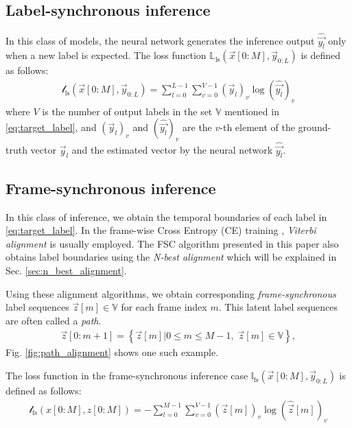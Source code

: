 \documentclass{article}
\begin{document}
\subsection{Label-synchronous inference}
In this class of models, the neural network generates the inference output 
$\widehat{\vec{y_l}}$ 
only when a new label is expected. The loss function 
$\mathbb{L}_{\text{ls}}\left(\vec{x}[0:M], \vec{y}_{0:L}\right)$ is 
defined as follows:
   \begin{align}
     \mathcal{l}_{\text{ls}}\left(\vec{x}[0:M], 
        \vec{y}_{0:L}\right) 
        = \sum_{l=0}^{L-1} 
          \sum_{v=0}^{V-1}
          \left(\vec{y}_l\right)_v  \log ( 
             \widehat{\vec{y_l}} )_{v}
          \label{eq:label_synchronous_ce_loss} 
   \end{align}
where $V$ is the number of output labels in the set $\mathbb{V}$ 
mentioned in \eqref{eq:target_label}, and ${(\vec{y}_l)}_v$  
and ${(\widehat{\vec{y_l}})}_{v}$ are the $v$-th element of the 
ground-truth vector $\vec{y}_l$ and the estimated vector by the 
neural network ${\widehat{\vec{y_l}}}$.


\subsection{Frame-synchronous inference}
\label{sec:frame_synchronous_inference}
In this class of inference,  we obtain
the temporal boundaries of each label in \eqref{eq:target_label}.
In the frame-wise Cross Entropy (CE) training 
\cite{g_hinton_ieee_signal_processing_mag_2012_00, 
C_Kim_INTERSPEECH_2017_1, 
B_Li_INTERSPEECH_2017_1}, {\it Viterbi alignment}  
\cite{
x_huang_prentice_hall_2001_00,
l_r_rabiner_proceedings_of_ieee_1989_00} is usually employed. 
The FSC algorithm presented in this paper also obtains
label boundaries using the {\it N-best alignment} which will
be explained in Sec. \ref{sec:n_best_alignment}.

Using these alignment algorithms, 
we obtain corresponding {\it frame-synchronous} label sequences 
$\vec{z}[m] \in \mathbb{V}$ for each frame index $m$. This
latent label sequences are often called a {\it path}.
  \begin{align}
    \vec{z}[0:m+1]  =  
      \left\{\vec{z}[m]  \Big| 0 \le m \le M-1, \; \vec{z}[m] \in \mathbb{V} \right\}, 
    \label{eq:latent_label_seq}
  \end{align}
Fig. \ref{fig:path_alignment} shows one such example. 

The loss function in the frame-synchronous inference case
$\mathbb{l}_{\text{fs}}\left(\vec{x}[0:M], \vec{y}_{0:L}\right)$ is 
defined as follows:
\begin{align}
  \mathcal{l}_{\text{fs}}\left(x[0:M], z[0:M]\right) 
      = - \sum_{l=0}^{M-1} 
          \sum_{v=0}^{V-1}  
            (\vec{z}[m])_v  \log (\widehat{\vec{z}}[m])_v  
        \label{eq:frame_synchronous_ce_loss} 
\end{align}
\end{document}
